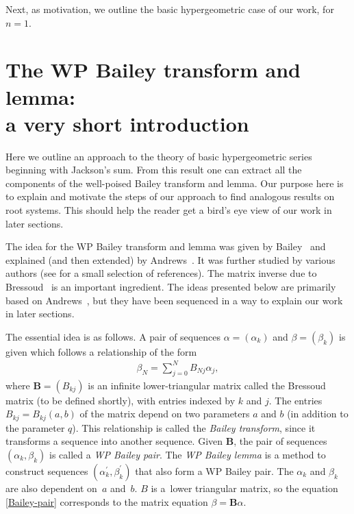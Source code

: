 \documentclass[pdftex]{sigma}
\numberwithin{equation}{section}
\newcommand{\B}{{ \mathbf B}}
\begin{document}
Next, as motivation, we outline the basic hypergeometric case of our work, for $n=1$.

\section[The WP Bailey transform and lemma: a very short introduction]{The WP Bailey transform and lemma:\\ a very short introduction}\label{sec:WPBailey}

Here we outline an approach to the theory of basic hypergeometric series beginning with Jackson's sum. From this result one can extract all the components of the well-poised Bailey transform and lemma. Our purpose here is to explain and motivate the steps of our approach to find analogous results on root systems. This should help the reader get a bird's eye view of our work in later sections.

The idea for the WP Bailey transform and lemma was given by Bailey~\cite{WNB1947} and explained (and then extended) by Andrews~\cite{Andrews2001}. It was further studied by various authors (see \cite{AndBer2002,Jouhet2010, MSZ2009, VPS2002, SSY2017, SOW2003, ZL2016} for a small selection of references). The matrix inverse due to Bressoud~\cite{DB1983} is an important ingredient. The ideas presented below are primarily based on Andrews~\cite{Andrews2001}, but they have been sequenced in a way to explain our work in later sections.

The essential idea is as follows.
A pair of sequences $\alpha = (\alpha_k)$ and $\beta = (\beta_k)$ is given which follows a relationship of the form
\begin{gather}\label{Bailey-pair}
\beta_N = \sum_{j=0}^N B_{Nj} \alpha_j,
\end{gather}
where $\B = (B_{kj})$ is an infinite lower-triangular matrix called the Bressoud matrix (to be defined shortly), with entries indexed by $k$ and $j$. The entries $B_{kj} = B_{kj}(a,b)$ of the matrix depend on two parameters $a$ and $b$ (in addition to the parameter $q$). This relationship is called the {\em Bailey transform}, since it transforms a sequence into another sequence. Given $\B$, the pair of sequences
$(\alpha_k, \beta_k)$ is called a \emph{WP Bailey pair}. The \emph{WP Bailey lemma} is a method to construct sequences $(\alpha^{\prime}_k, \beta^{\prime}_k)$ that also form a WP Bailey pair. The $\alpha_k$ and $\beta_k$ are also dependent on~$a$ and~$b$. $B$ is a~lower triangular matrix, so the equation \eqref{Bailey-pair} corresponds to the matrix equation $\beta = \B\alpha$.
\end{document}
